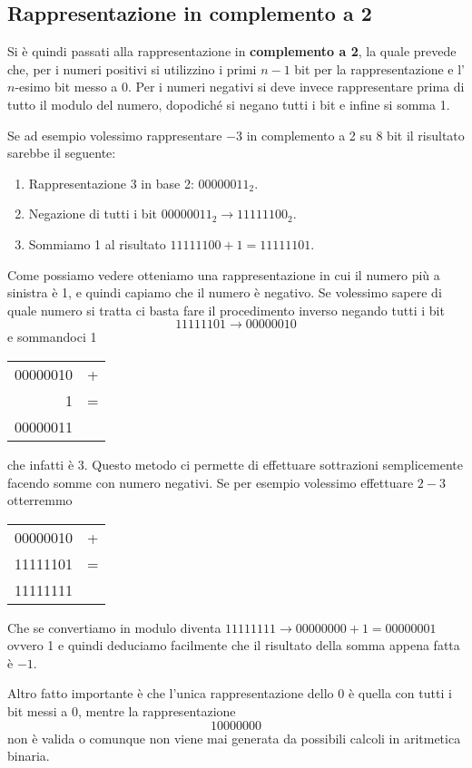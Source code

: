 \subsection{Rappresentazione in complemento a 2}
Si è quindi passati alla rappresentazione in \textbf{complemento a 2}, la quale prevede che, per i
numeri positivi si utilizzino i primi $n-1$ bit per la rappresentazione e l'$n$-esimo bit messo a 0.
Per i numeri negativi si deve invece rappresentare prima di tutto il modulo del numero, dopodiché
si negano tutti i bit e infine si somma 1.

Se ad esempio volessimo rappresentare $-3$ in complemento a 2 su 8 bit il risultato sarebbe il
seguente:
\begin{enumerate}
	\item Rappresentazione 3 in base 2: $00000011_2$.
	\item Negazione di tutti i bit $00000011_2 \to 11111100_2$.
	\item Sommiamo 1 al risultato $11111100 + 1 = 11111101$.
\end{enumerate}
Come possiamo vedere otteniamo una rappresentazione in cui il numero più a sinistra è 1, e quindi
capiamo che il numero è negativo. Se volessimo sapere di quale numero si tratta ci basta fare il
procedimento inverso negando tutti i bit
\[ 11111101 \to 00000010 \]
e sommandoci 1
\begin{center}
	\begin{tabular}{r c}
		00000010 & + \\
		1        & = \\ \hline
		00000011
	\end{tabular}
\end{center}
che infatti è 3. Questo metodo ci permette di effettuare sottrazioni semplicemente facendo somme
con numero negativi. Se per esempio volessimo effettuare $2 - 3$ otterremmo
\begin{center}
	\begin{tabular}{r c}
		00000010 & + \\
		11111101 & = \\ \hline
		11111111
	\end{tabular}
\end{center}
Che se convertiamo in modulo diventa $11111111 \to 00000000 + 1 = 00000001$ ovvero 1 e quindi
deduciamo facilmente che il risultato della somma appena fatta è $-1$.

Altro fatto importante è che l'unica rappresentazione dello 0 è quella con tutti i bit messi a 0,
mentre la rappresentazione
\[ 10000000 \]
non è valida o comunque non viene mai generata da possibili calcoli in aritmetica binaria.

